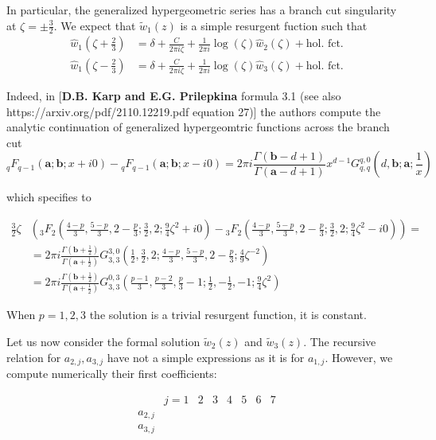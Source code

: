 \documentclass{article}
\begin{document}
In particular, the generalized hypergeometric series has a branch cut singularity at $\zeta=\pm\tfrac{3}{2}$. We expect that $\tilde{w}_1(z)$ is a simple resurgent fuction such that 
\begin{align*}
\hat{w}_1(\zeta+\tfrac{2}{3})&=\delta+\frac{C}{2\pi i\zeta}+\frac{1}{2\pi i}\log(\zeta)\hat{w}_2(\zeta)+\text{hol. fct.}\\
\hat{w}_1(\zeta-\tfrac{2}{3})&=\delta+\frac{C}{2\pi i\zeta}+\frac{1}{2\pi i}\log(\zeta)\hat{w}_3(\zeta)+\text{hol. fct.}
\end{align*}

Indeed, in [\textbf{D.B. Karp and E.G. Prilepkina} formula 3.1 (see also \textsf{https://arxiv.org/pdf/2110.12219.pdf} equation 27)] the authors compute the analytic continuation of generalized hypergeomtric functions across the branch cut
\begin{equation}
{}_qF_{q-1}\left(\mathbf{a};\mathbf{b};x+i0\right)-{}_qF_{q-1}\left(\mathbf{a};\mathbf{b};x-i0\right)=2\pi i\frac{\Gamma(\mathbf{b}-d+1)}{\Gamma(\mathbf{a}-d+1)}x^{d-1}G_{q,q}^{q,0}\left(d,\mathbf{b};\mathbf{a};\frac{1}{x}\right)
\end{equation}

which specifies to 

\begin{align*}
\frac{3}{2}\zeta&\left({}_3F_2\left(\frac{4-p}{3},\frac{5-p}{3},2-\frac{p}{3};\frac{3}{2},2;\frac{9}{4}\zeta^2+i0\right)-{}_3F_2\left(\frac{4-p}{3},\frac{5-p}{3},2-\frac{p}{3};\frac{3}{2},2;\frac{9}{4}\zeta^2-i0\right)\right)=\\
&=2\pi i\frac{\Gamma(\mathbf{b}+\tfrac{1}{2})}{\Gamma(\mathbf{a}+\tfrac{1}{2})}G_{3,3}^{3,0}\left(\frac{1}{2},\frac{3}{2},2;\frac{4-p}{3},\frac{5-p}{3},2-\frac{p}{3};\frac{4}{9}\zeta^{-2}\right)\\
&=2\pi i\frac{\Gamma(\mathbf{b}+\tfrac{1}{2})}{\Gamma(\mathbf{a}+\tfrac{1}{2})}G_{3,3}^{0,3}\left(\frac{p-1}{3},\frac{p-2}{3},\frac{p}{3}-1;\frac{1}{2},-\frac{1}{2},-1;\frac{9}{4}\zeta^{2}\right)
\end{align*}

When $p=1,2,3$ the solution is a trivial resurgent function, it is constant.


Let us now consider the formal solution $\tilde{w}_2(z)$ and $\tilde{w}_3(z)$. The recursive relation for $a_{2,j},a_{3,j}$ have not a simple expressions as it is for $a_{1,j}$. However, we compute numerically their first coefficients:

\begin{align*}
 &j=1 & 2 & 3& 4& 5& 6& 7 \\
a_{2,j}& & & & & & & \\
a_{3,j}& & & & & & & 
\end{align*}    



\end{document}
